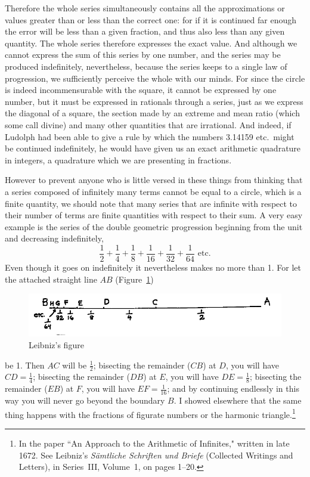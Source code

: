 \documentclass[polutonikogreek,english,twoside,openright]{article}
\begin{document}
\vspace*{1ex}

\noindent Therefore the whole series simultaneously contains all the
approximations or values greater than or less than the correct one:
for if it is continued far enough the error will be less than a given
fraction, and thus also less than any given quantity.  The whole
series therefore expresses the exact value.  And although we cannot
express the sum of this series by one number, and the series may be
produced indefinitely, nevertheless, because the series keeps to a
single law of progression, we sufficiently perceive the whole with our
minds. For since the circle is indeed incommensurable with the square,
it cannot be expressed by one number, but it must be expressed in
rationals through a series, just as we express the diagonal of a
square, the section made by an extreme and mean ratio (which some call
divine) and many other quantities that are irrational.  And indeed, if
Ludolph had been able to give a rule by which the numbers 3.14159
etc.\ might be continued indefinitely, he would have given us an exact
arithmetic quadrature in integers, a quadrature which we are
presenting in fractions.

However to prevent anyone who is little versed in these things from
thinking that a series composed of infinitely many terms cannot be
equal to a circle, which is a finite quantity, we should note that
many series that are infinite with respect to their number of terms
are finite quantities with respect to their sum.  A very easy example
is the series of the double geometric progression beginning from the
unit and decreasing indefinitely,
$$\frac{1}{2}
+ \frac{1}{4} +\frac{1}{8} + \frac{1}{16} + \frac{1}{32} +
\frac{1}{64}\mbox{ etc.}$$ Even though it goes on indefinitely it
nevertheless makes no more than 1.  For let the attached straight line
$AB$ (Figure~\ref{linesum})
\begin{figure}[htp]
  \begin{center}
    \includegraphics[width=\textwidth]{fig/Figure62}
    \vspace{-20pt}
    \caption{Leibniz's figure}
    \label{linesum}
  \end{center}
\end{figure} be 1.  Then $AC$ will be $\frac{1}{2}$; bisecting the
remainder ($CB$) at $D$, you will have $CD = \frac{1}{4}$; bisecting
the remainder ($DB$) at $E$, you will have $DE = \frac{1}{8}$;
bisecting the remainder ($EB$) at $F$, you will have
$EF = \frac{1}{16}$; and by continuing endlessly in this way you will
never go beyond the boundary $B$.  I showed elsewhere that the same
thing happens with the fractions of figurate numbers or the harmonic
triangle.\footnote{In the paper ``An Approach to the Arithmetic of
  Infinites," written in late 1672.  See Leibniz's {\em S\"{a}mtliche
    Schriften und Briefe} (Collected Writings and Letters), in
  Series~III, Volume~1, on pages 1--20.}
\end{document}
